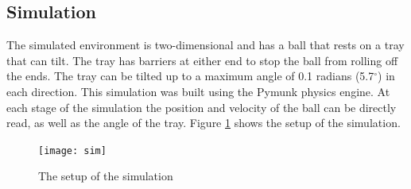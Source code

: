 \documentclass[12pt,a4paper]{article}
\begin{document}
\subsection{Simulation}
The simulated environment is two-dimensional and has a ball that rests on a tray that can tilt. The tray has barriers at either end to stop the ball from rolling off the ends. The tray can be tilted up to a maximum angle of 0.1 radians (5.7$^\circ$) in each direction. This simulation was built using the Pymunk physics engine. At each stage of the simulation the position and velocity of the ball can be directly read, as well as the angle of the tray.  Figure \ref{sim} shows the setup of the simulation.
\begin{figure}[H]
	\centering
	\texttt{[image: sim]}
	\caption{The setup of the simulation}
	\label{sim}
\end{figure}
\end{document}
